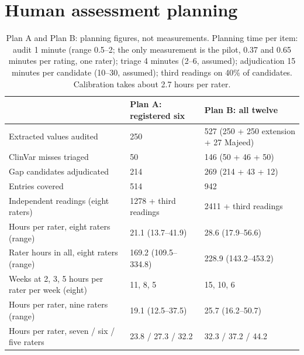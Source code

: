 \documentclass{article} %
\begin{document}
\section{Human assessment planning}
\label{app:planning}
\begin{table}[h]
\caption{Plan A and Plan B: planning figures, not measurements. Planning time per item: audit 1 minute (range 0.5--2; the only measurement is the pilot, 0.37 and 0.65 minutes per rating, one rater); triage 4 minutes (2--6, assumed); adjudication 15 minutes per candidate (10--30, assumed); third readings on 40\% of candidates. Calibration takes about 2.7 hours per rater.}
\begin{center}
\scriptsize
\begin{tabular}{lll}
\toprule
 & Plan A: registered six & Plan B: all twelve \\
\midrule
Extracted values audited & 250 & 527 (250 + 250 extension + 27 Majeed) \\
ClinVar misses triaged & 50 & 146 (50 + 46 + 50) \\
Gap candidates adjudicated & 214 & 269 (214 + 43 + 12) \\
Entries covered & 514 & 942 \\
Independent readings (eight raters) & 1278 + third readings & 2411 + third readings \\
Hours per rater, eight raters (range) & 21.1 (13.7--41.9) & 28.6 (17.9--56.6) \\
Rater hours in all, eight raters (range) & 169.2 (109.5--334.8) & 228.9 (143.2--453.2) \\
Weeks at 2, 3, 5 hours per rater per week (eight) & 11, 8, 5 & 15, 10, 6 \\
Hours per rater, nine raters (range) & 19.1 (12.5--37.5) & 25.7 (16.2--50.7) \\
Hours per rater, seven / six / five raters & 23.8 / 27.3 / 32.2 & 32.3 / 37.2 / 44.2 \\
\bottomrule
\end{tabular}
\end{center}
\end{table}
\end{document}
